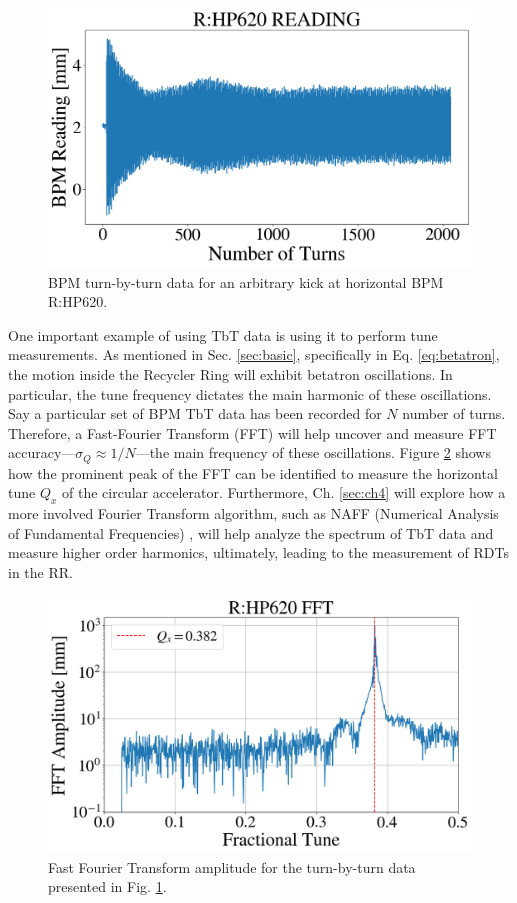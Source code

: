 \begin{figure}[H]
   \centering
   \includegraphics[width=\columnwidth]{chapter3/bpm_kick.png}
   \caption{BPM turn-by-turn data for an arbitrary kick at horizontal BPM R:HP620.}
   \label{fig:bpmkick}
\end{figure}

One important example of using TbT data is using it to perform tune measurements. As mentioned in Sec. \ref{sec:basic}, specifically in Eq. \ref{eq:betatron}, the motion inside the Recycler Ring will exhibit betatron oscillations. In particular, the tune frequency dictates the main harmonic of these oscillations. Say a particular set of BPM TbT data has been recorded for $N$ number of turns. Therefore, a Fast-Fourier Transform (FFT) will help uncover and measure FFT accuracy---$\sigma_Q\approx 1/N $---the main frequency of these oscillations. Figure \ref{fig:bpmfft} shows how the prominent peak of the FFT can be identified to measure the horizontal tune $Q_x$ of the circular accelerator. Furthermore, Ch. \ref{sec:ch4} will explore how a more involved Fourier Transform algorithm, such as NAFF (Numerical Analysis of Fundamental Frequencies) \cite{naff}, will help analyze the spectrum of TbT data and measure higher order harmonics, ultimately, leading to the measurement of RDTs in the RR.     

\begin{figure}[H]
   \centering
   \includegraphics[width=\columnwidth]{chapter3/bpm_fft.png}
   \caption{Fast Fourier Transform amplitude for the turn-by-turn data presented in Fig. \ref{fig:bpmkick}.}
   \label{fig:bpmfft}
\end{figure}


